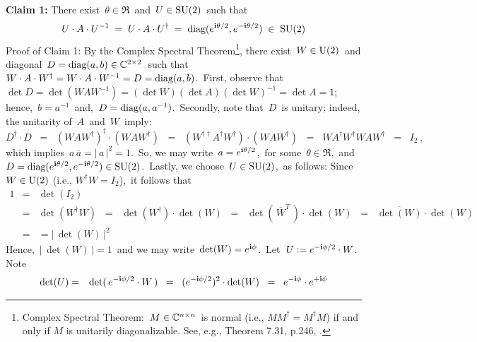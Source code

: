 \begin{enumerate}
	\vskip 0.3cm
	\noindent
	\textbf{Claim 1:}\quad
	There exist
	\,$\theta \in \Re$\,
	and
	\,$U \in \textnormal{SU}(2)$\,
	such that
	\begin{equation*}
	U \cdot A \cdot U^{-1}
	\; = \;
		U \cdot A \cdot U^{\dagger}
	\; = \;
		\textnormal{diag}(e^{\textnormal{\bf i}\theta/2},e^{-\textnormal{\bf i}\theta/2})
	\; \in \;
		\textnormal{SU}(2)
	\end{equation*}
	\vskip 0.1cm
	\noindent
	Proof of Claim 1:\;\;
	By the {\color{red}Complex Spectral Theorem}\footnote{Complex Spectral Theorem:
	\,$M \in \mathbb{C}^{n \times n}$\,
	is normal (i.e., $MM^{\dagger} = M^{\dagger}M$)
	if and only if $M$ is unitarily diagonalizable.
	See, e.g., Theorem 7.31, p.246, \cite{Axler2024}.},
	there exist \,$W \in \textnormal{U}(2)$\, and diagonal
	\,$D = \textnormal{diag}(a,b) \in \mathbb{C}^{2 \times 2}$\,
	such that
	\,$W \cdot A \cdot W^{\dagger} = W \cdot A \cdot W^{-1} = D = \textnormal{diag}(a,b)$.\,
	First, observe that 
	\,$\det D = \det(WAW^{-1}) = (\det W)(\det A)(\det W)^{-1} = \det A = 1$;\,
	hence,
	\,$b = a^{-1}$\,
	and,
	\,$D = \textnormal{diag}(a,a^{-1})$.\,
	Secondly, note that
	\,$D$\, is unitary; indeed, the unitarity of \,$A$\, and \,$W$\, imply:
	\begin{equation*}
	D^{\dagger} \cdot D
	\;\; = \;\;
		(W A W^{\dagger})^{\dagger} \cdot (W A W^{\dagger})
	\;\; = \;\;
		(W^{\dagger\dagger} A^{\dagger} W^{\dagger}) \cdot (W A W^{\dagger})
	\;\; = \;\;
		W A^{\dagger} W^{\dagger} W A W^{\dagger}
	\;\; = \;\;
		I_{2}\,,
	\end{equation*}
	which implies
	\,$a\,\overline{a} = \vert\,a\,\vert^{2} = 1$.\,
	So, we may write
	\,$a = e^{\textnormal{\bf i}\theta/2}$,\,
	for some
	\,$\theta \in \Re$,\,
	and
	\,$D = \textnormal{diag}(e^{\textnormal{\bf i}\theta/2},e^{-\textnormal{\bf i}\theta/2}) \in \textnormal{SU}(2)$.\,
	Lastly, we choose \,$U \in \textnormal{SU}(2)$,\, as follows:
	Since \,$W \in \textnormal{U}(2)$ (i.e., $W^{\dagger}W = I_{2}$),\,
	it follows that
	\begin{eqnarray*}
	1
	& = &
		\det(I_{2})
	\\
	& = &
		\det(W^{\dagger}W)
	\;\; = \;\;
		\det(W^{\dagger})\cdot\det(W)
	\;\; = \;\;
		\det(\,\overline{W}^{T}\,)\cdot\det(W)
	\;\; = \;\;
		\overline{\det(W)}\cdot\det(W)
	\\
	& = &
		= \vert\,\det(W)\,\vert^{2}
	\end{eqnarray*}
	Hence,
	\,$\vert\,\det(W)\,\vert = 1$\,
	and we may write
	\,$\det(W)  = e^{\textnormal{\bf i}\phi}$.\,
	Let \,$U := e^{-\textnormal{\bf i}\phi/2} \cdot W$.\,
	Note
	\begin{eqnarray*}
	\det(U)
	& = &
		\det(\,e^{-\i\phi/2} \cdot W\,)
	\;\; = \;\;
		(e^{-\i\phi/2})^{2} \cdot \det(W)
	\;\; = \;\;
		e^{-\i\phi} \cdot e^{+\i\phi}

\end{eqnarray*}
\end{enumerate}
